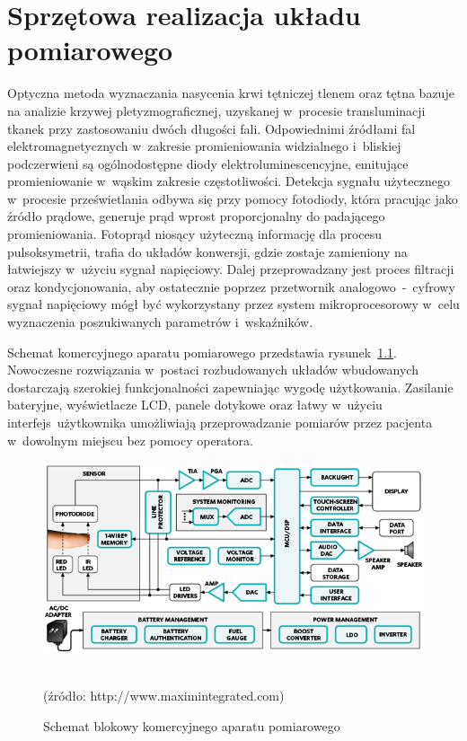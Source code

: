 \renewcommand{\figurename}{Rys.}

\chapter{Sprzętowa realizacja układu pomiarowego}
\label{cha:Sprzęt}

\fontsize{14}{15}\selectfont

Optyczna metoda wyznaczania nasycenia krwi tętniczej tlenem oraz tętna bazuje na analizie krzywej pletyzmograficznej, uzyskanej w~procesie transluminacji tkanek przy zastosowaniu dwóch długości fali.
Odpowiednimi źródłami fal elektromagnetycznych w~zakresie promieniowania widzialnego i~bliskiej podczerwieni są ogólnodostępne diody elektroluminescencyjne, emitujące promieniowanie w~wąskim 
zakresie częstotliwości. Detekcja sygnału użytecznego w~procesie prześwietlania odbywa się przy pomocy fotodiody, która pracując jako źródło prądowe, generuje prąd wprost proporcjonalny do 
padającego promieniowania. Fotoprąd niosący użyteczną informację dla procesu pulsoksymetrii, trafia do układów konwersji, gdzie zostaje zamieniony na łatwiejszy w~użyciu sygnał napięciowy. Dalej 
przeprowadzany jest proces filtracji oraz kondycjonowania, aby ostatecznie poprzez przetwornik analogowo~-~cyfrowy sygnał napięciowy mógł być wykorzystany przez system mikroprocesorowy 
w~celu wyznaczenia poszukiwanych parametrów i~wskaźników.

Schemat komercyjnego aparatu pomiarowego przedstawia rysunek~\ref{rys:Schematic}. Nowoczesne rozwiązania w~postaci rozbudowanych układów wbudowanych dostarczają szerokiej funkcjonalności 
zapewniając wygodę użytkowania. Zasilanie bateryjne, wyświetlacze LCD, panele dotykowe oraz łatwy w~użyciu interfejs~użytkownika umożliwiają przeprowadzanie pomiarów przez pacjenta w~dowolnym 
miejscu bez pomocy operatora.
\begin{figure}[!h]
	\centerline{\includegraphics[scale = 0.76]{graphic/Schematic}}
	\caption{Schemat blokowy komercyjnego aparatu pomiarowego}
	~\\
	(źródło: http://www.maximintegrated.com)
	\label{rys:Schematic}
\end{figure}


